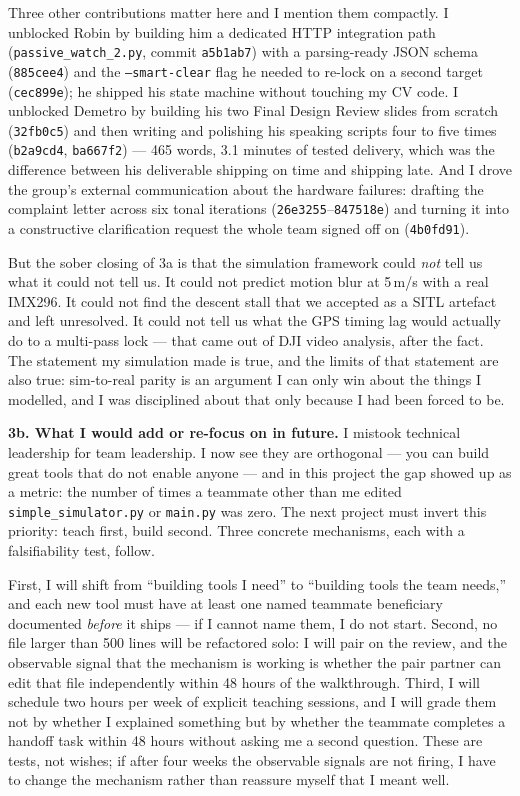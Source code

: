 Three other contributions matter here and I mention them compactly. I unblocked Robin by building him a dedicated HTTP integration path (\texttt{passive\_watch\_2.py}, commit \texttt{a5b1ab7}) with a parsing-ready JSON schema (\texttt{885cee4}) and the \texttt{--smart-clear} flag he needed to re-lock on a second target (\texttt{cec899e}); he shipped his state machine without touching my CV code. I unblocked Demetro by building his two Final Design Review slides from scratch (\texttt{32fb0c5}) and then writing and polishing his speaking scripts four to five times (\texttt{b2a9cd4}, \texttt{ba667f2}) --- 465 words, 3.1 minutes of tested delivery, which was the difference between his deliverable shipping on time and shipping late. And I drove the group's external communication about the hardware failures: drafting the complaint letter across six tonal iterations (\texttt{26e3255}--\texttt{847518e}) and turning it into a constructive clarification request the whole team signed off on (\texttt{4b0fd91}).

But the sober closing of 3a is that the simulation framework could \emph{not} tell us what it could not tell us. It could not predict motion blur at 5\,m/s with a real IMX296. It could not find the descent stall that we accepted as a SITL artefact and left unresolved. It could not tell us what the GPS timing lag would actually do to a multi-pass lock --- that came out of DJI video analysis, after the fact. The statement my simulation made is true, and the limits of that statement are also true: sim-to-real parity is an argument I can only win about the things I modelled, and I was disciplined about that only because I had been forced to be.

\textbf{3b. What I would add or re-focus on in future.} I mistook technical leadership for team leadership. I now see they are orthogonal --- you can build great tools that do not enable anyone --- and in this project the gap showed up as a metric: the number of times a teammate other than me edited \texttt{simple\_simulator.py} or \texttt{main.py} was zero. The next project must invert this priority: teach first, build second. Three concrete mechanisms, each with a falsifiability test, follow.

First, I will shift from ``building tools I need'' to ``building tools the team needs,'' and each new tool must have at least one named teammate beneficiary documented \emph{before} it ships --- if I cannot name them, I do not start. Second, no file larger than 500 lines will be refactored solo: I will pair on the review, and the observable signal that the mechanism is working is whether the pair partner can edit that file independently within 48 hours of the walkthrough. Third, I will schedule two hours per week of explicit teaching sessions, and I will grade them not by whether I explained something but by whether the teammate completes a handoff task within 48 hours without asking me a second question. These are tests, not wishes; if after four weeks the observable signals are not firing, I have to change the mechanism rather than reassure myself that I meant well.
